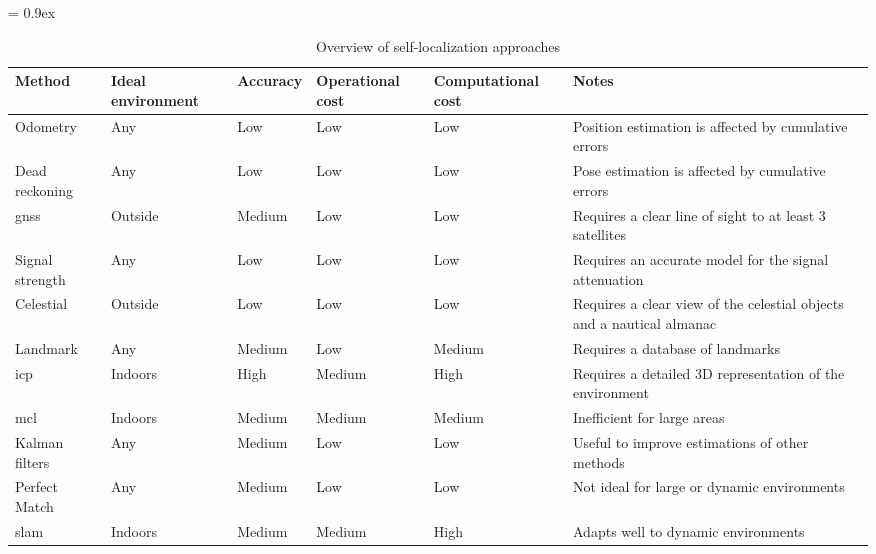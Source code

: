 \begin{sidewaystable}
	\caption{Overview of self-localization approaches}
	\tabulinesep = 0.9ex
	\centering
	\begin{tabu} { X[1.4,m,c] | X[m,c] X[m,c] X[m,c] X[m,c] X[6,m,c] }
		\rowfont{\bfseries\itshape} Method & Ideal environment & Accuracy & Operational cost & Computational cost & Notes \\
		\hline
		Odometry			& Any		& Low		& Low		& Low		& Position estimation is affected by cumulative errors \\
		Dead reckoning		& Any		& Low		& Low		& Low		& Pose estimation is affected by cumulative errors \\
		\gls{gnss}			& Outside	& Medium	& Low		& Low		& Requires a clear line of sight to at least 3 satellites \\
		Signal strength		& Any		& Low		& Low		& Low		& Requires an accurate model for the signal attenuation \\
		Celestial			& Outside	& Low		& Low		& Low		& Requires a clear view of the celestial objects and a nautical almanac \\
		Landmark			& Any		& Medium	& Low		& Medium	& Requires a database of landmarks \\
		\gls{icp}			& Indoors	& High		& Medium	& High		& Requires a detailed 3D representation of the environment \\
		\gls{mcl}			& Indoors	& Medium	& Medium	& Medium	& Inefficient for large areas \\
		Kalman filters		& Any		& Medium	& Low		& Low		& Useful to improve estimations of other methods \\
		Perfect Match		& Any		& Medium	& Low		& Low		& Not ideal for large or dynamic environments \\
		\gls{slam}			& Indoors	& Medium	& Medium	& High		& Adapts well to dynamic environments \\
	\end{tabu}
	\label{tab:localization-methods_overview-self-localization-approaches}
\end{sidewaystable}
